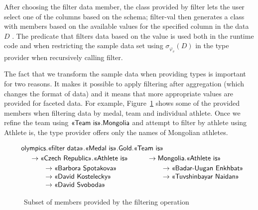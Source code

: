 \documentclass[a4paper,UKenglish]{lipics-v2016}
\theoremstyle{plain}
\theoremstyle{definition}
\newcommand{\ball}[1]{\FPeval{\result}{clip(201+#1)}\textnormal{\ding{\result}}}
\newcommand{\ident}[1]{\textnormal{\sffamily #1}}
\newcommand{\qident}[1]{\textnormal{\sffamily \guillemotleft #1\guillemotright}}
\begin{document}
After choosing the \qident{filter data} member, the class provided by \ident{filter} lets the 
user select one of the columns \ball{4} based on the schema; \ident{filter-val} then 
generates a class with members based on the available values for the specified column in the data 
$D$ \ball{5}. The predicate that filters data based on the value \ball{6} is used both in the 
runtime code and when restricting the sample data set using $\sigma_{\varphi_v}(D)$ 
in the type provider when recursively calling \ident{filter}.

The fact that we transform the sample data when providing types is important for two reasons.
It makes it possible to apply filtering after aggregation (which changes the format of data)
and it means that more appropriate values are provided for faceted data. For example,
Figure~\ref{fig:pivot-filter} shows some of the provided members when filtering data by medal,
team and individual athlete. Once we refine the team using $\qident{Team is}.\ident{Mongolia}$
and attempt to filter by athlete using \qident{Athlete is}, the type provider offers only the
names of Mongolian athletes.

 
\begin{figure}
\begin{equation*}
\hspace{-1em}
\begin{array}{l}
\ident{olympics}.\qident{filter data}.\qident{Medal is}.\ident{Gold}.\qident{Team is}\\[0.25em]
\quad\begin{array}{l}
\rightarrow \qident{Czech Republic}.\qident{Athlete is}\\[0.25em]
\qquad \rightarrow \qident{Barbora Spotakova}\\
\qquad \rightarrow \qident{David Kostelecky}\\
\qquad \rightarrow \qident{David Svoboda}\\
\end{array}\qquad
\begin{array}{l}
\rightarrow \ident{Mongolia}.\qident{Athlete is}\\[0.25em]
\qquad \rightarrow \qident{Badar-Uugan Enkhbat}\\
\qquad \rightarrow \qident{Tuvshinbayar Naidan}\\
\\
\end{array}
\end{array}
\end{equation*}
\caption{Subset of members provided by the filtering operation}
\label{fig:pivot-filter}
\end{figure}
\end{document}
